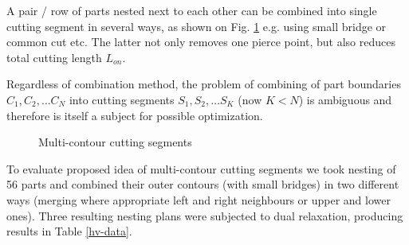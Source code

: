 \documentclass{../download/tPRS2e}
\begin{document}
A pair / row of parts nested next to each other
can be combined into single cutting segment
in several ways,
as shown on Fig. \ref{merge}
e.g. using small bridge or common cut etc.
The latter not only removes one pierce point,
but also reduces total cutting length $L_{on}$.

Regardless of combination method,
the problem of combining of part boundaries
$C_1, C_2, \dots C_N$
into cutting segments
$S_1, S_2, \dots S_K$
(now $K<N$)
is ambiguous and therefore
is itself a subject for possible optimization.

\begin{figure}
    \begin{center}
    \caption{Multi-contour cutting segments} \label{merge}
    \end{center}
\end{figure}

To evaluate proposed idea of multi-contour cutting segments
we took nesting of 56 parts and combined 
their outer contours
(with small bridges)
in two different ways
(merging where appropriate left and right neighbours
or upper and lower ones).
Three resulting nesting plans were subjected to
dual relaxation, producing results in Table \ref{hv-data}.
\end{document}
